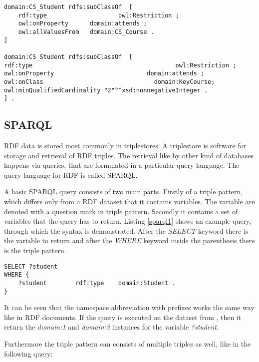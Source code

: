\begin{lstlisting}[basicstyle=\footnotesize, captionpos=b, caption=Restrictions defined as blank nodes, label=lst:sparql, belowskip=1em, aboveskip=2em,
frame=single]
domain:CS_Student rdfs:subClassOf  [ 
	rdf:type					owl:Restriction ; 
	owl:onProperty		domain:attends ; 
	owl:allValuesFrom	domain:CS_Course .
]

domain:CS_Student rdfs:subClassOf  [
rdf:type										owl:Restriction ; 
owl:onProperty							domain:attends ; 
owl:onClass								  domain:KeyCourse; 
owl:minQualifiedCardinality "2"^^xsd:nonnegativeInteger .
] .
\end{lstlisting}


\subsection{SPARQL}


RDF data is stored most commonly in triplestores. A triplestore is software for storage and retrieval of RDF triples. The retrieval like by other kind of databases happens via queries, that are formulated in a particular query language. The query language for RDF is called SPARQL. 

A basic SPARQL query consists of two main parts. Firstly of a triple pattern, which differs only from a RDF dataset that it contains variables. The variable are denoted with a question mark in triple pattern. Secondly it contains a set of variables that the query has to return. Listing \ref{sparql1} shows an example query, through which the syntax is demonstrated. After the \textit{SELECT} keyword there is the variable to return and after the \textit{WHERE} keyword inside the parenthesis there is the triple pattern.

\begin{lstlisting}[captionpos=b, caption=SPARQL Query I., label=sparql1, belowskip=1em, aboveskip=2em, 
basicstyle=\footnotesize,frame=single]
SELECT ?student  
WHERE { 
	?student		rdf:type	domain:Student .	
}
\end{lstlisting}


It can be seen that the namespace abbreviation with prefixes works the same way like in RDF documents. If the query is executed on the dataset from , then it return the \textit{domain:1} and \textit{domain:3} instances for the variable \textit{?student}. 




Furthermore the triple pattern can consists of  multiple triples as well, like in the following query:

